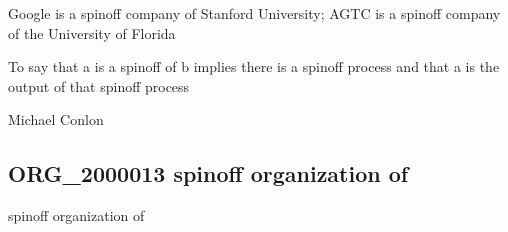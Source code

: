 \documentclass[letterpaper,10pt,english]{sphinxmanual}
\begin{document}
\begin{sphinxShadowBox}

\sphinxAtStartPar
{\hyperref[\detokenize{doc-ORG_2000013::doc}]{}}
\end{sphinxShadowBox}

\begin{sphinxShadowBox}

\sphinxAtStartPar
Google is a spin\sphinxhyphen{}off company of Stanford University; AGTC is a spin\sphinxhyphen{}off company of the University of Florida
\end{sphinxShadowBox}

\begin{sphinxShadowBox}

\sphinxAtStartPar
To say that a is a spin\sphinxhyphen{}off of b implies there is a spin\sphinxhyphen{}off process and that a is the output of that spin\sphinxhyphen{}off process
\end{sphinxShadowBox}

\begin{sphinxShadowBox}

\sphinxAtStartPar
Michael Conlon 
\end{sphinxShadowBox}
\begin{quote}

\ignorespaces \end{quote}


\subsection{ORG\_2000013 \sphinxhyphen{} spin\sphinxhyphen{}off organization of}
\label{\detokenize{doc-ORG_2000013:org-2000013-spin-off-organization-of}}\label{\detokenize{doc-ORG_2000013:index-0}}\label{\detokenize{doc-ORG_2000013::doc}}
\begin{sphinxShadowBox}

\sphinxAtStartPar
spin\sphinxhyphen{}off organization of
\end{sphinxShadowBox}
\end{document}
